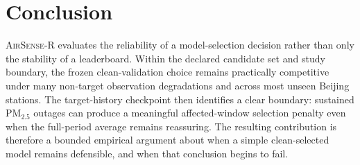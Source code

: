 \documentclass[journal]{IEEEtran}
\newcommand{\AirSense}{\textsc{AirSense-R}}
\begin{document}
\section{Conclusion}
\AirSense{} evaluates the reliability of a model-selection decision rather than only the stability of a leaderboard. Within the declared candidate set and study boundary, the frozen clean-validation choice remains practically competitive under many non-target observation degradations and across most unseen Beijing stations. The target-history checkpoint then identifies a clear boundary: sustained PM$_{2.5}$ outages can produce a meaningful affected-window selection penalty even when the full-period average remains reassuring. The resulting contribution is therefore a bounded empirical argument about when a simple clean-selected model remains defensible, and when that conclusion begins to fail.

\FloatBarrier
\balance


\end{document}
